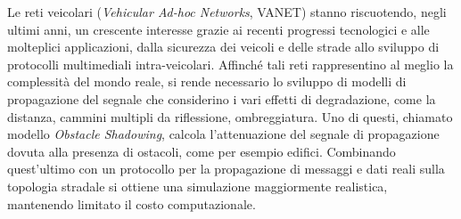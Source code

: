 
Le reti veicolari (\textit{Vehicular Ad-hoc Networks}, VANET) stanno riscuotendo, negli ultimi anni, un crescente interesse
grazie ai recenti progressi tecnologici e alle molteplici applicazioni, dalla sicurezza dei veicoli e delle strade allo sviluppo di protocolli
multimediali intra-veicolari.
Affinché tali reti rappresentino al meglio la complessità del mondo reale, si rende necessario lo sviluppo di modelli di propagazione del segnale
che considerino i vari effetti di degradazione, come la distanza, cammini multipli da riflessione, ombreggiatura.
Uno di questi, chiamato modello \textit{Obstacle Shadowing}, calcola l'attenuazione del segnale di propagazione dovuta alla presenza di ostacoli, come per esempio edifici.
Combinando quest'ultimo con un protocollo per la propagazione di messaggi e dati reali sulla topologia stradale si ottiene una simulazione maggiormente realistica,
mantenendo limitato il costo computazionale.
%

